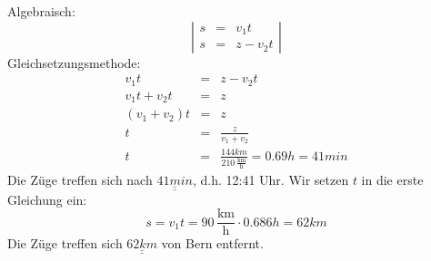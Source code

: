 \documentclass[%
11pt,%
twoside,%
titlepage,%
german,%
]{scrartcl}
\newcommand{\ufrac}[2]{\ensuremath{\,\frac{\mathrm{#1}}{\mathrm{#2}}}}
\newcommand{\result}[1]{\underline{\underline{#1}}}
\begin{document}
\begin{enumerate}
\begin{enumerate}
    Algebraisch:
    \begin{displaymath}
      \left| 
        \begin{array}{rcl}
          s & = &  v_1 t \\
          s & = & z-v_2 t
        \end{array} \right|
    \end{displaymath}
    Gleichsetzungsmethode:
    \begin{eqnarray*}
      v_1 t & = & z - v_2 t \\
      v_1 t + v_2 t & = & z \\
      (v_1 + v_2)t & = & z \\
      t & = & \frac{z}{v_1+v_2} \\
      t & = & \frac{144\unit{km}}{210\ufrac{km}{h}}=0.69\unit{h}=41\unit{min}
    \end{eqnarray*}
    Die Z\"uge treffen sich nach $\result{41\unit{min}}$, d.h. 12:41 Uhr. Wir setzen $t$ in die erste Gleichung ein:
    \begin{displaymath}
      s = v_1 t = 90\ufrac{km}{h} \cdot 0.686\unit{h} = 62\unit{km}
    \end{displaymath}
    Die Z\"uge treffen sich $\result{62\unit{km}}$ von Bern entfernt.
  \end{enumerate}



\end{enumerate}
\end{document}
